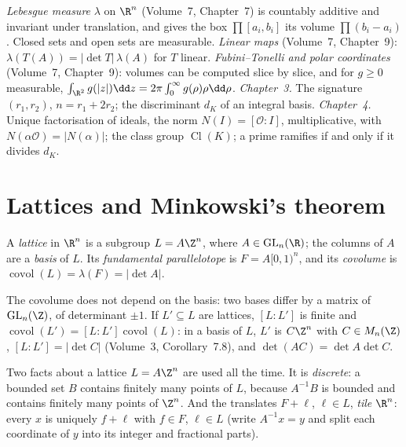 \begin{reminder}
\emph{Lebesgue measure} $\lambda$ on $\R^n$ (Volume~7, Chapter~7) is countably additive and invariant under translation, and
gives the box $\prod[a_i,b_i]$ its volume $\prod(b_i-a_i)$. Closed sets and open sets are measurable. \emph{Linear maps}
(Volume~7, Chapter~9): $\lambda(T(A))=|\det T|\,\lambda(A)$ for $T$ linear. \emph{Fubini--Tonelli and polar coordinates}
(Volume~7, Chapter~9): volumes can be computed slice by slice, and for $g\ge0$ measurable,
$\int_{\R^2}g(|z|)\dd z=2\pi\int_0^\infty g(\rho)\rho\dd\rho$. \emph{Chapter~3.} The signature $(r_1,r_2)$, $n=r_1+2r_2$;
the discriminant $d_K$ of an integral basis. \emph{Chapter~4.} Unique factorisation of ideals, the norm
$N(I)=[\mathcal O:I]$, multiplicative, with $N(\alpha\mathcal O)=|N(\alpha)|$; the class group $\operatorname{Cl}(K)$;
a prime ramifies if and only if it divides $d_K$.
\end{reminder}

\section{Lattices and Minkowski's theorem}

\begin{definition}
A \emph{lattice} in $\R^n$ is a subgroup $L=A\Z^n$, where $A\in\mathrm{GL}_n(\R)$; the columns of $A$ are a
\emph{basis} of $L$. Its \emph{fundamental parallelotope} is $F=A[0,1)^n$, and its \emph{covolume} is
$\operatorname{covol}(L)=\lambda(F)=|\det A|$.
\end{definition}

The covolume does not depend on the basis: two bases differ by a matrix of $\mathrm{GL}_n(\Z)$, of determinant $\pm1$. If
$L'\subseteq L$ are lattices, $[L:L']$ is finite and $\operatorname{covol}(L')=[L:L']\operatorname{covol}(L)$: in a basis
of $L$, $L'$ is $C\Z^n$ with $C\in M_n(\Z)$, $[L:L']=|\det C|$ (Volume~3, Corollary~7.8), and $\det(AC)=\det A\det C$.

Two facts about a lattice $L=A\Z^n$ are used all the time. It is \emph{discrete}: a bounded set $B$ contains finitely
many points of $L$, because $A^{-1}B$ is bounded and contains finitely many points of $\Z^n$. And the translates $F+\ell$,
$\ell\in L$, \emph{tile} $\R^n$: every $x$ is uniquely $f+\ell$ with $f\in F$, $\ell\in L$ (write $A^{-1}x=y$ and split
each coordinate of $y$ into its integer and fractional parts).

